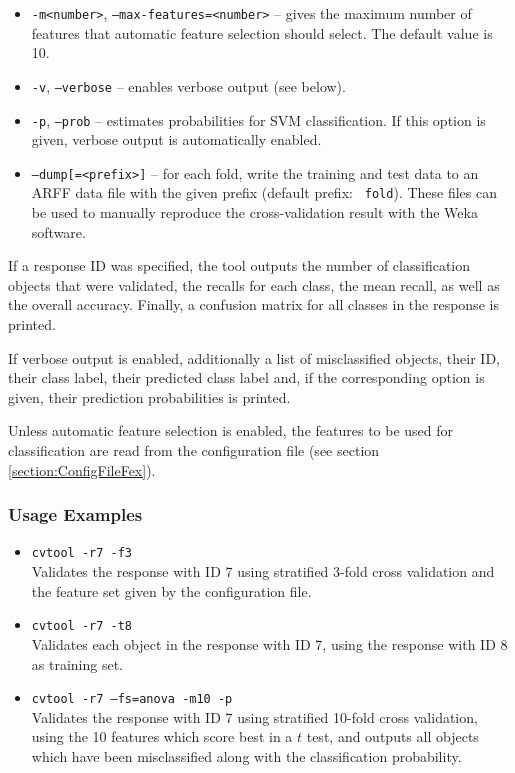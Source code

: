 \begin{itemize}
{      algorithm} is {\tt correlation}, features are rated by their correlation
    with their class label.
  \item {\tt -m<number>}, {\tt --max-features=<number>} -- gives the maximum
    number of features that automatic feature selection should select.  The
    default value is 10.
  \item {\tt -v}, {\tt --verbose} -- enables verbose output (see below).
  \item {\tt -p}, {\tt --prob} -- estimates probabilities for SVM
    classification. If this option is given, verbose output is automatically
    enabled.
  \item {\tt --dump[=<prefix>]} -- for each fold, write the training and test
    data to an ARFF data file with the given prefix (default prefix: {\tt
      fold}). These files can be used to manually reproduce the
    cross-validation result with the Weka \cite{Weka} software.
\end{itemize}

If a response ID was specified, the tool outputs the number of classification
objects that were validated, the recalls for each class, the mean recall, as
well as the overall accuracy. Finally, a confusion matrix for all classes in the
response is printed.

If verbose output is enabled, additionally a list of misclassified objects,
their ID, their class label, their predicted class label and, if the
corresponding option is given, their prediction probabilities is printed.

Unless automatic feature selection is enabled, the features to be used for
classification are read from the configuration file (see section
\ref{section:ConfigFileFex}).


\subsubsection{Usage Examples}

\begin{itemize}
  \item {\tt cvtool -r7 -f3}\\
    Validates the response with ID 7 using stratified 3-fold cross validation
    and the feature set given by the configuration file.
  \item {\tt cvtool -r7 -t8}\\
    Validates each object in the response with ID 7, using the response with ID
    8 as training set.
  \item {\tt cvtool -r7 --fs=anova -m10 -p}\\
    Validates the response with ID 7 using stratified 10-fold cross validation,
    using the 10 features which score best in a $t$ test, and outputs all
    objects which have been misclassified along with the classification
    probability.
\end{itemize}


